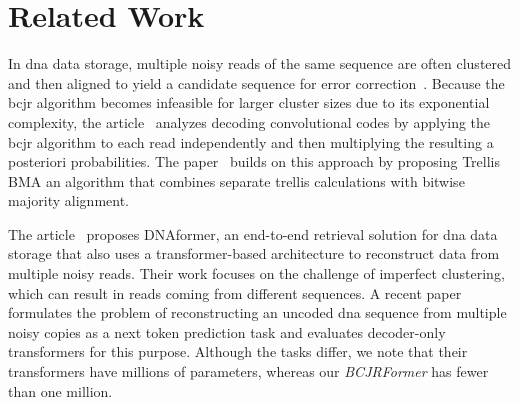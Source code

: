 \documentclass[conference,letterpaperu]{IEEEtran}
\begin{document}




\section{Related Work}
In \ac{dna} data storage, multiple noisy reads of the same sequence are often clustered and then aligned to yield a candidate sequence for error correction~\cite{organickRandomAccessLargescale2018, barlev2024deepdnastoragescalable, girsch2025trace,antkowiakLowCostDNA2020}. Because the \ac{bcjr} algorithm becomes infeasible for larger cluster sizes due to its exponential complexity, the article~\cite{maaroufConcatenatedCodesMultiple2023a} analyzes decoding convolutional codes by applying the \ac{bcjr} algorithm to each read independently and then multiplying the resulting a posteriori probabilities. The paper~\cite{srinivasavaradhanTrellisBMACoded2021} builds on this approach by proposing Trellis BMA\,\textemdash\,an algorithm that combines separate trellis calculations with bitwise majority alignment. 

The article~\cite{barlev2024deepdnastoragescalable} proposes DNAformer, an end-to-end retrieval solution for \ac{dna} data storage that also uses a transformer-based architecture to reconstruct data from multiple noisy reads. Their work focuses on the challenge of imperfect clustering, which can result in reads coming from different sequences. 
A recent paper~\cite{girsch2025trace} formulates the problem of reconstructing an uncoded \ac{dna} sequence from multiple noisy copies as a next token prediction task and evaluates decoder-only transformers for this purpose. Although the tasks differ, we note that their transformers have millions of parameters, whereas our \textit{BCJRFormer} has fewer than one million.
\end{document}
